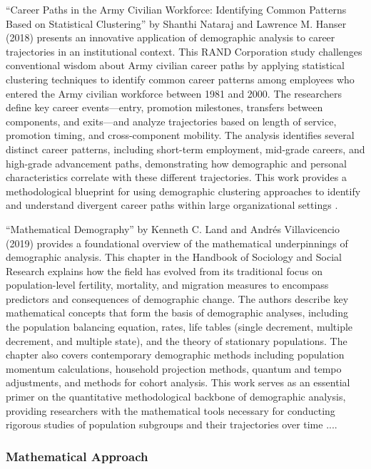 \documentclass[../main.tex]{subfiles}
\begin{document}
``Career Paths in the Army Civilian Workforce: Identifying Common Patterns Based on Statistical Clustering'' by Shanthi Nataraj and Lawrence M. Hanser (2018) presents an innovative application of demographic analysis to career trajectories in an institutional context. This RAND Corporation study challenges conventional wisdom about Army civilian career paths by applying statistical clustering techniques to identify common career patterns among employees who entered the Army civilian workforce between 1981 and 2000. The researchers define key career events—entry, promotion milestones, transfers between components, and exits—and analyze trajectories based on length of service, promotion timing, and cross-component mobility. The analysis identifies several distinct career patterns, including short-term employment, mid-grade careers, and high-grade advancement paths, demonstrating how demographic and personal characteristics correlate with these different trajectories. This work provides a methodological blueprint for using demographic clustering approaches to identify and understand divergent career paths within large organizational settings \citep{nataraj2018career}.

``Mathematical Demography'' by Kenneth C. Land and Andrés Villavicencio (2019) provides a foundational overview of the mathematical underpinnings of demographic analysis. This chapter in the Handbook of Sociology and Social Research explains how the field has evolved from its traditional focus on population-level fertility, mortality, and migration measures to encompass predictors and consequences of demographic change. The authors describe key mathematical concepts that form the basis of demographic analyses, including the population balancing equation, rates, life tables (single decrement, multiple decrement, and multiple state), and the theory of stationary populations. The chapter also covers contemporary demographic methods including population momentum calculations, household projection methods, quantum and tempo adjustments, and methods for cohort analysis. This work serves as an essential primer on the quantitative methodological backbone of demographic analysis, providing researchers with the mathematical tools necessary for conducting rigorous studies of population subgroups and their trajectories over time \citep{land2019mathematical}.... \subsubsection{Mathematical Approach}
\end{document}
